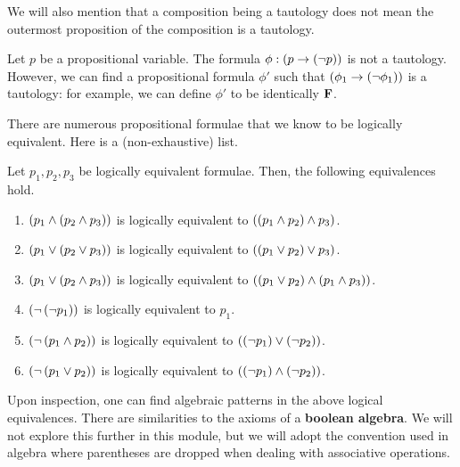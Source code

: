 We will also mention that a composition being a tautology does not mean the outermost proposition of the composition is a tautology.

\begin{boxnexample}
    Let $p$ be a propositional variable. The formula $\phi : \left( p \to \left( \neg p \right) \right)$ is not a tautology. However, we can find a propositional formula $\phi'$ such that $\left( \phi_1 \to \left( \neg \phi_1 \right) \right)$ is a tautology: for example, we can define $\phi'$ to be identically $\mathbf{F}$.
\end{boxnexample}

There are numerous propositional formulae that we know to be logically equivalent. Here is a (non-exhaustive) list.

\begin{boxexample}
    Let $p_1, p_2, p_3$ be logically equivalent formulae. Then, the following equivalences hold.
    \begin{enumerate}[noitemsep]
        \item $\left( p_1 \land \left( p_2 \land p_3 \right) \right)$ is logically equivalent to $\left( \left( p_1 \land p_2 \right) \land p_3 \right)$.
        
        \item $\left( p_1 \lor \left( p_2 \lor p_3 \right) \right)$ is logically equivalent to $\left( \left( p_1 \lor p_2 \right) \lor p_3 \right)$.

        \item $\left( p_1 \lor \left( p_2 \land p_3 \right) \right)$ is logically equivalent to $\left( \left( p_1 \lor p_2 \right) \land \left( p_1 \land p_3 \right) \right)$.

        \item $\left( \neg \left( \neg p_1 \right) \right)$ is logically equivalent to $p_1$.

        \item $\left( \neg \left( p_1 \land p_2 \right) \right)$ is logically equivalent to $\left( \left( \neg p_1 \right) \lor \left( \neg p_2 \right) \right)$.

        \item $\left( \neg \left( p_1 \lor p_2 \right) \right)$ is logically equivalent to $\left( \left( \neg p_1 \right) \land \left( \neg p_2 \right) \right)$.
    \end{enumerate}
\end{boxexample}

Upon inspection, one can find algebraic patterns in the above logical equivalences. There are similarities to the axioms of a \textbf{boolean algebra}. %
We will not explore this further in this module, but we will adopt the convention used in algebra where parentheses are dropped when dealing with associative operations.

